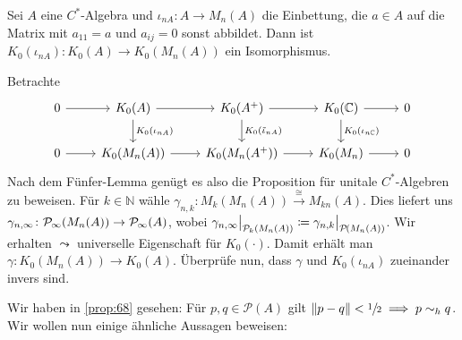 \begin{proposition}[label=prop:711]
	Sei $A$ eine $C^*$-Algebra und $\iota_{nA} \colon A \to M_n(A)$ die Einbettung, die $a \in A$ auf die Matrix mit $a_{11}= a$ und $a_{ij}=0$ sonst abbildet.
	Dann ist $K_0(\iota_{nA}) \colon K_0(A) \to K_0(M_n(A))$ ein Isomorphismus.
\end{proposition}
\begin{beweis}
	Betrachte 
	\[
		\begin{tikzcd}
			0 \rar & K_0(A) \rar \dar["K_0(\iota_{nA})"] & K_0(A^+) \rar \dar["K_0(\tilde{\iota}_{nA})"] & K_0(\mathbb{C}) \rar \dar["K_0(\iota_{n \mathbb{C}})"] & 0 \\
			0 \rar & K_0(M_n(A)) \rar & K_0(M_n(A^+)) \rar & K_0(M_n) \rar & 0
		\end{tikzcd}
	\]
	Nach dem Fünfer-Lemma genügt es also die Proposition für unitale $C^*$-Algebren zu beweisen.
	Für $k \in \mathbb{N}$ wähle $\gamma_{n,k} \colon M_k(M_n(A)) \xrightarrow{\cong} M_{kn}(A)$.
	Dies liefert uns $\gamma_{n,\infty} \colon \Pinfty(M_n(A)) \to \Pinfty(A)$, wobei $\gamma_{n,\infty} \big|_{\kernedP_k(M_n(A))} \coloneqq \gamma_{n,k}\big|_{\kernedP(M_n(A))}$.
	Wir erhalten
	$\leadsto$ universelle Eigenschaft für $K_0(\cdot)$. 
	Damit erhält man $\gamma \colon K_0(M_n(A)) \to K_0(A)$.
	Überprüfe nun, dass $\gamma$ und $K_0(\iota_{nA})$ zueinander invers sind.
\end{beweis}

Wir haben in \autoref{prop:68} gesehen: Für $p,q \in \mathcal{P}(A)$ gilt $\norm*{p-q} < \sfrac{1}{2} \implies p \sim_h q$.
Wir wollen nun einige ähnliche Aussagen beweisen:

